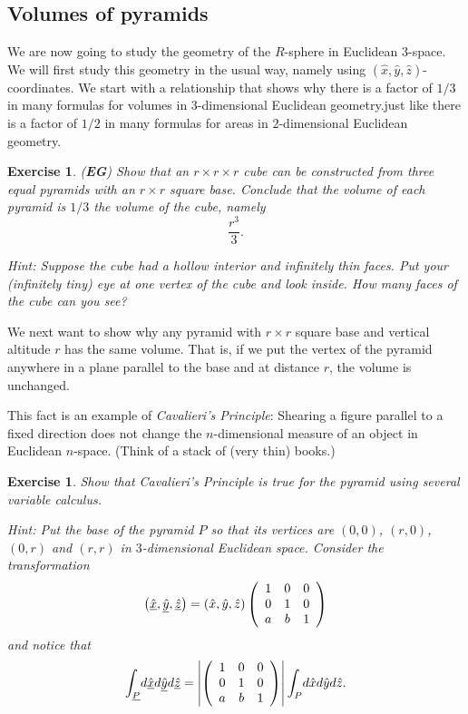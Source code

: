 \documentclass{article}%
\newtheorem{exercise}[theorem]{Exercise}
\begin{document}
\subsection{Volumes of pyramids}

We are now going to study the geometry of the $R$-sphere in Euclidean
$3$-space. We will first study this geometry in the usual way, namely using
$\left(  \hat{x},\hat{y},\hat{z}\right)  $-coordinates. We start with a
relationship that shows why there is a factor of $1/3$ in many formulas for
volumes in $3$-dimensional Euclidean geometry.just like there is a factor of
$1/2$ in many formulas for areas in $2$-dimensional Euclidean geometry.

\begin{exercise}
(\textbf{EG}) Show that an $r\times r\times r$ cube can be constructed from
three equal pyramids with an $r\times r$ square base. Conclude that the volume
of each pyramid is $1/3$ the volume of the cube, namely
\[
\frac{r^{3}}{3}.
\]


Hint: Suppose the cube had a hollow interior and infinitely thin faces. Put
your (infinitely tiny) eye at one vertex of the cube and look inside. How many
faces of the cube can you see?
\end{exercise}

We next want to show why any pyramid with $r\times r$ square base and vertical
altitude $r$ has the same volume. That is, if we put the vertex of the pyramid
anywhere in a plane parallel to the base and at distance $r$, the volume is unchanged.

This fact is an example of \textit{Cavalieri's Principle}: Shearing a figure
parallel to a fixed direction does not change the $n$-dimensional measure of
an object in Euclidean $n$-space. (Think of a stack of (very thin) books.)

\begin{exercise}
Show that Cavalieri's Principle is true for the pyramid using several variable calculus.

Hint: Put the base of the pyramid $P$ so that its vertices are $\left(
0,0\right)  $, $\left(  r,0\right)  $, $\left(  0,r\right)  $ and $\left(
r,r\right)  $ in $3$-dimensional Euclidean space. Consider the transformation%
\[
\left(  \underline{\hat{x}},\underline{\hat{y}},\underline{\hat{z}}\right)
=\left(  \hat{x},\hat{y},\hat{z}\right)  \left(
\begin{array}
[c]{ccc}%
1 & 0 & 0\\
0 & 1 & 0\\
a & b & 1
\end{array}
\right)
\]
and notice that%
\[%
{\displaystyle\int\nolimits_{\underline{P}}}
d\underline{\hat{x}}d\underline{\hat{y}}d\underline{\hat{z}}=\left\vert
\left(
\begin{array}
[c]{ccc}%
1 & 0 & 0\\
0 & 1 & 0\\
a & b & 1
\end{array}
\right)  \right\vert
{\displaystyle\int\nolimits_{P}}
d\hat{x}d\hat{y}d\hat{z}.
\]
\pagebreak
\end{exercise}
\end{document}

